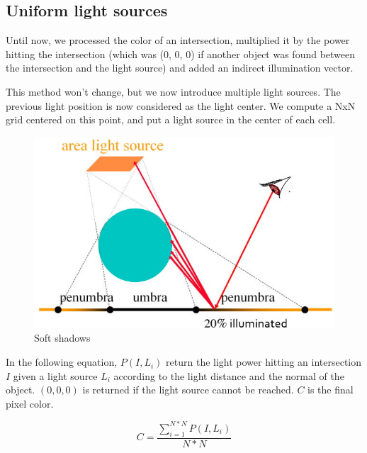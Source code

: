 \subsection{Uniform light sources}
Until now, we processed the color of an intersection, multiplied it by the power hitting the intersection (which was (0, 0, 0) if another object was found between the intersection and the light source) and added an indirect illumination vector.

This method won't change, but we now introduce multiple light sources. The previous light position is now considered as the light center. We compute a NxN grid centered on this point, and put a light source in the center of each cell.

\begin{figure}[H]
\centering
\includegraphics[width=0.4\linewidth]{img/shadows/light1.jpg}
\caption{Soft shadows}
\label{fig:light_uniform}
\end{figure}

In the following equation, $P(I, L_i)$ return the light power hitting an intersection $I$ given a light source $L_i$ according to the light distance and the normal of the object. $(0, 0, 0)$ is returned if the light source cannot be reached. $C$ is the final pixel color.

\begin{equation}
C = \frac{ \sum\limits_{i = 1}^{N*N} P(I, L_i) }{N * N}
\end{equation}


